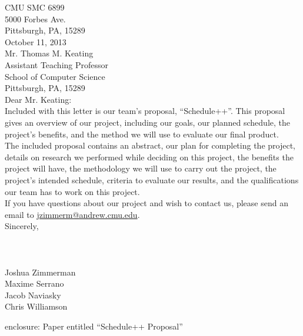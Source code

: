 \thispagestyle{empty}
{\parindent 0pt %
CMU SMC 6899\\
5000 Forbes Ave.\\
Pittsburgh, PA, 15289\\


October 11, 2013\\


Mr. Thomas M. Keating\\
Assistant Teaching Professor\\
School of Computer Science\\
Pittsburgh, PA, 15289\\


Dear Mr. Keating:\\


Included with this letter is our team's proposal, ``Schedule++''. This proposal
gives an overview of our project, including our goals, our planned schedule,
the project's benefits, and the method we will use to evaluate our final
product.\\


The included proposal contains an abstract, our plan for completing the project,
details on research we performed while deciding on this project, the benefits
the project will have, the methodology we will use to carry out the project, the
project's intended schedule, criteria to evaluate our results, and the
qualifications our team has to work on this project.\\


If you have questions about our project and wish to contact us, please send an
email to \href{mailto:jzimmerm@andrew.cmu.edu}{jzimmerm@andrew.cmu.edu}.\\


Sincerely,\\
\\
\\
\\
Joshua Zimmerman\\
Maxime Serrano\\
Jacob Naviasky\\
Chris Williamson

\vfill

enclosure: Paper entitled ``Schedule++ Proposal''
} %
\newpage

